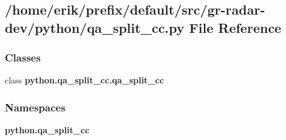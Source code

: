 \subsection{/home/erik/prefix/default/src/gr-\/radar-\/dev/python/qa\+\_\+split\+\_\+cc.py File Reference}
\label{qa__split__cc_8py}
\subsubsection*{Classes}
\begin{DoxyCompactItemize}
\item 
class {\bf python.\+qa\+\_\+split\+\_\+cc.\+qa\+\_\+split\+\_\+cc}
\end{DoxyCompactItemize}
\subsubsection*{Namespaces}
\begin{DoxyCompactItemize}
\item 
 {\bf python.\+qa\+\_\+split\+\_\+cc}
\end{DoxyCompactItemize}
